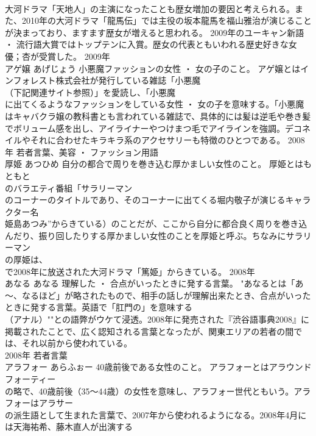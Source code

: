 \documentclass[8pt]{extreport}
\begin{document}
\begin{CJK}{UTF8}{min}
\\	大河ドラマ「天地人」の主演になったことも歴女増加の要因と考えられる。また、2010年の大河ドラマ「龍馬伝」では主役の坂本龍馬を福山雅治が演じることが決まっており、ますます歴女が増えると思われる。 2009年のユーキャン新語 ・ 流行語大賞ではトップテンに入賞。歴女の代表ともいわれる歴史好きな女優；杏が受賞した。	2009年	
\\	アゲ嬢	あげじょう	小悪魔ファッションの女性 ・ 女の子のこと。	アゲ嬢とはインフォレスト株式会社が発行している雑誌「小悪魔
\\	（下記関連サイト参照）」を愛読し、「小悪魔
\\	に出てくるようなファッションをしている女性 ・ 女の子を意味する。「小悪魔
\\	はキャバクラ嬢の教科書とも言われている雑誌で、具体的には髪は逆毛や巻き髪でボリューム感を出し、アイライナーやつけまつ毛でアイラインを強調。デコネイルやそれに合わせたキラキラ系のアクセサリーも特徴のひとつである。	2008年	若者言葉、美容 ・ ファッション用語	
\\	厚姫	あつひめ	自分の都合で周りを巻き込む厚かましい女性のこと。	厚姫とはもともと
\\	のバラエティ番組「サラリーマン
\\	のコーナーのタイトルであり、そのコーナーに出てくる堀内敬子が演じるキャラクター名
\\	姫島あつみ”からきている）のことだが、ここから自分に都合良く周りを巻き込んだり、振り回したりする厚かましい女性のことを厚姫と呼ぶ。ちなみにサラリーマン
\\	の厚姫は、
\\	で2008年に放送された大河ドラマ「篤姫」からきている。	2008年	
\\	あなる	あなる	理解した ・ 合点がいったときに発する言葉。	"あなるとは「あ～、なるほど」が略されたもので、相手の話しが理解出来たとき、合点がいったときに発する言葉。英語で「肛門の」を意味する
\\	（アナル）""との語弊がウケて浸透。2008年に発売された『渋谷語事典2008』に掲載されたことで、広く認知される言葉となったが、関東エリアの若者の間では、それ以前から使われている。
\\	2008年	若者言葉	
\\	アラフォー	あらふぉー	40歳前後である女性のこと。	アラフォーとはアラウンドフォーティー
\\	の略で、40歳前後（35～44歳）の女性を意味し、アラフォー世代ともいう。アラフォーはアラサー
\\	の派生語として生まれた言葉で、2007年から使われるようになる。2008年4月には天海祐希、藤木直人が出演する

\end{CJK}
\end{document}
